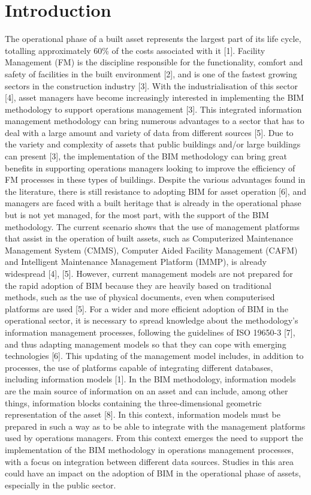 \section{Introduction}
\label{sec:introduction}

The operational phase of a built asset represents the largest part of its life cycle, totalling approximately 60\% of the costs associated with it [1]. Facility Management (FM) is the discipline responsible for the functionality, comfort and safety of facilities in the built environment [2], and is one of the fastest growing sectors in the construction industry [3]. With the industrialisation of this sector [4], asset managers have become increasingly interested in implementing the BIM methodology to support operations management [3]. This integrated information management methodology can bring numerous advantages to a sector that has to deal with a large amount and variety of data from different sources [5]. Due to the variety and complexity of assets that public buildings and/or large buildings can present [3], the implementation of the BIM methodology can bring great benefits in supporting operations managers looking to improve the efficiency of FM processes in these types of buildings. Despite the various advantages found in the literature, there is still resistance to adopting BIM for asset operation [6], and managers are faced with a built heritage that is already in the operational phase but is not yet managed, for the most part, with the support of the BIM methodology. The current scenario shows that the use of management platforms that assist in the operation of built assets, such as Computerized Maintenance Management System (CMMS), Computer Aided Facility Management (CAFM) and Intelligent Maintenance Management Platform (IMMP), is already widespread [4], [5]. However, current management models are not prepared for the rapid adoption of BIM because they are heavily based on traditional methods, such as the use of physical documents, even when computerised platforms are used [5]. For a wider and more efficient adoption of BIM in the operational sector, it is necessary to spread knowledge about the methodology's information management processes, following the guidelines of ISO 19650-3 [7], and thus adapting management models so that they can cope with emerging technologies [6]. This updating of the management model includes, in addition to processes, the use of platforms capable of integrating different databases, including information models [1]. In the BIM methodology, information models are the main source of information on an asset and can include, among other things, information blocks containing the three-dimensional geometric representation of the asset [8]. In this context, information models must be prepared in such a way as to be able to integrate with the management platforms used by operations managers. From this context emerges the need to support the implementation of the BIM methodology in operations management processes, with a focus on integration between different data sources. Studies in this area could have an impact on the adoption of BIM in the operational phase of assets, especially in the public sector.
